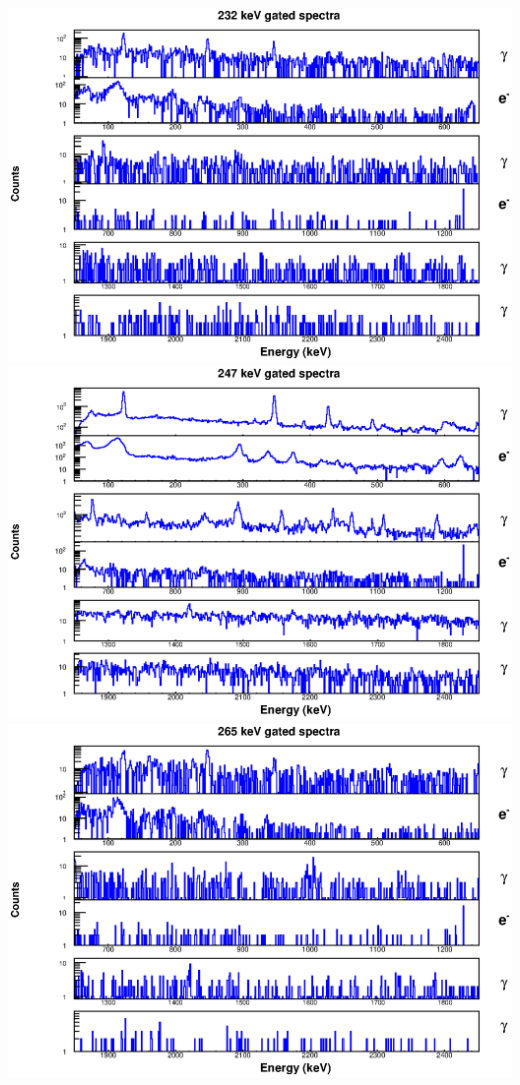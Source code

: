 \includegraphics[scale=0.8]{154Gd_Appendix/232_combined.eps}
\includegraphics[scale=0.8]{154Gd_Appendix/247_combined.eps}
\includegraphics[scale=0.8]{154Gd_Appendix/265_combined.eps}
